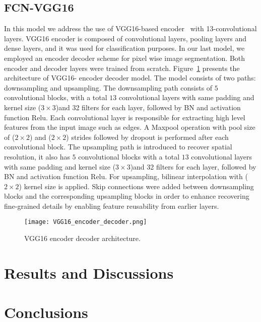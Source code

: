 \documentclass[preprint,9pt]{elsarticle}
\begin{document}
\subsection{FCN-VGG16}
In this model we address the use of VGG16-based encoder~\cite{Simonyan2015} with 13-convolutional layers.
VGG16 encoder is composed of convolutional layers, pooling layers and dense layers, and it was used for classification purposes. 
In our last model, we employed an encoder decoder scheme for pixel wise image segmentation. 
Both encoder and decoder layers were trained from scratch.
Figure~\ref{vgg16} presents the architecture of VGG16- encoder decoder model. 
The model consists of two paths: downsampling and upsampling.
The downsampling path consists of \(5\) convolutional blocks,  with a total \(13\) convolutional layers  with same padding and kernel size (\(3\times3\))and 32 filters for each layer, followed by BN and activation function Relu.
Each convolutional layer is responsible for extracting high level features from the input image such as edges.
A Maxpool operation with pool size of (\(2\times2\))  and (\(2\times2\)) strides followed by dropout is performed after each convolutional block. 
The upsampling path is introduced to recover spatial resolution, it also has \(5\) convolutional blocks with a total \(13\) convolutional layers  with same padding and kernel size (\(3\times3\))and 32 filters for each layer, followed by BN and activation function Relu.
For upsampling, bilinear interpolation with (\(2\times2\)) kernel size is applied.
Skip connections were added between downsampling blocks and the corresponding upsampling blocks in order to enhance recovering fine-grained details by enabling feature reusability from earlier layers.
\begin{figure} [h!]
	\begin{center}
		\texttt{[image: VGG16\_encoder\_decoder.png]}
	\end{center}
	\caption{VGG16 encoder decoder architecture.} 
	\label{vgg16}
\end{figure}


\section{Results and Discussions}

\section{Conclusions}
	



\section*{}

	
\section*{ }
{}

	
	
\end{document}
